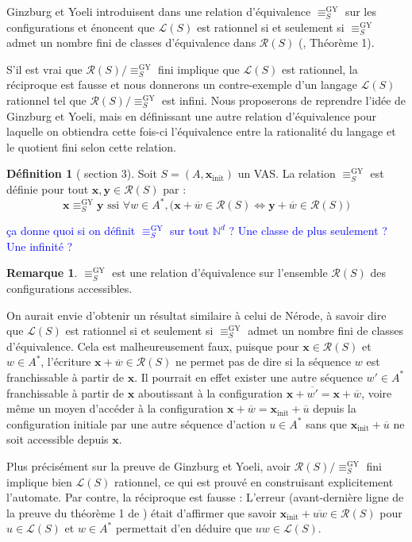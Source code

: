 \documentclass[a4paper,final]{article}
\theoremstyle{definition}
\newtheorem{Definition}[Theorem]{Définition}
\newtheorem*{Remark}{Remarque}
\newcommand{\alain}[1]{\textcolor{blue}{#1}}
\newcommand{\N}{\ensuremath{\mathbb{N}}}
\newcommand{\lang}{\ensuremath{\mathcal{L}}}
\newcommand{\reach}{\ensuremath{\mathcal{R}}}
\newcommand{\vect}[1]{\ensuremath{\mathbf{#1}}}
\newcommand{\relGY}{\ensuremath{\equiv^\text{GY}_S}}
\newcommand{\ssi}{\ensuremath{\text{ ssi }}}
\newcommand{\equivaut}{\ensuremath{\Leftrightarrow}}
\newcommand{\xinit}{\ensuremath{\vect{x}_\text{init}}}
\newcommand{\valeur}[1]{\ensuremath{\overline{#1}}}
\begin{document}
Ginzburg et Yoeli introduisent dans \cite{giyo80} une relation d'équivalence $\relGY$ sur les configurations et énoncent que $\lang(S)$ est rationnel si et seulement si $\relGY$ admet un nombre fini de classes d'équivalence dans $\reach(S)$ (\cite{giyo80}, Théorème 1).

S'il est vrai que $\reach(S)/\relGY$ fini implique que $\lang(S)$ est rationnel, la réciproque est fausse et nous donnerons un contre-exemple d'un langage $\lang(S)$ rationnel tel que $\reach(S)/\relGY$ est infini. 
Nous proposerons de reprendre l'idée de Ginzburg et Yoeli,
mais en définissant une autre relation d'équivalence pour laquelle on obtiendra cette fois-ci l'équivalence entre la rationalité du langage et le quotient fini selon cette relation.

\begin{Definition}[\cite{giyo80} section 3]
Soit $S=(A,\xinit)$ un VAS. La relation $\relGY$ est définie pour tout $\vect{x},\vect{y} \in\reach(S)$ par : 
$$\vect{x}\relGY\vect{y} \ssi \forall w\in A^\ast, \big( \vect{x} +\valeur{w}\in\reach(S) \equivaut \vect{y} +\valeur{w}\in\reach(S) \big)$$
\end{Definition}
\alain{ça donne quoi si on définit $\relGY$ sur tout $\N^d$ ? Une classe de plus seulement ? Une infinité ?}

\begin{Remark}
$\relGY$ est une relation d'équivalence sur l'ensemble $\reach(S)$ des configurations accessibles.
\end{Remark}

On aurait envie d'obtenir un résultat similaire à celui de Nérode, à savoir dire que $\lang(S)$ est rationnel si et seulement si $\relGY$ admet un nombre fini de classes d'équivalence.
Cela est malheureusement faux, puisque pour $\vect{x}\in\reach(S)$ et $w\in A^\ast$, l'écriture $\vect{x} +\valeur{w}\in\reach(S)$ ne permet pas de dire si la séquence $w$ est franchissable à partir de $\vect{x}$.
Il pourrait en effet exister une autre séquence $w'\in A^\ast$ franchissable à partir de $\vect{x}$ aboutissant à la configuration $\vect{x} +\valeur{w'} = \vect{x} +\valeur{w}$,
voire même un moyen d'accéder à la configuration $\vect{x} +\valeur{w} = \xinit +\valeur{u}$ depuis la configuration initiale par une autre séquence d'action $u\in A^\ast$ sans que $\xinit +\valeur{u}$ ne soit accessible depuis $\vect{x}$.

Plus précisément sur la preuve de Ginzburg et Yoeli, 
avoir $\reach(S)/\relGY$ fini implique bien $\lang(S)$ rationnel, ce qui est prouvé en construisant explicitement l'automate.
Par contre, la réciproque est fausse : 
L'erreur (avant-dernière ligne de la preuve du théorème 1 de \cite{giyo80}) était d'affirmer que savoir $\xinit +\valeur{uw}\in\reach(S)$ pour $u\in\lang(S)$ et $w\in A^\ast$ permettait d'en déduire que $uw\in\lang(S)$.
\end{document}
